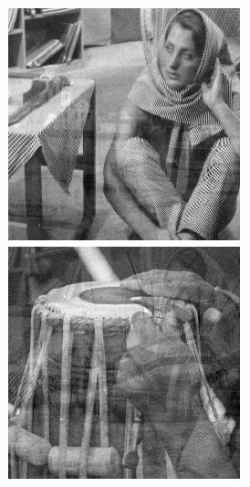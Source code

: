 \begin{figure}[!htbp]
{\begin{minipage}[b]{0.17\linewidth}
\includegraphics[width=1\linewidth]{images/mmcaex21.png}\vspace{4pt}
\includegraphics[width=1\linewidth]{images/mmca_ex23.png}
\end{minipage}}

\end{figure}

